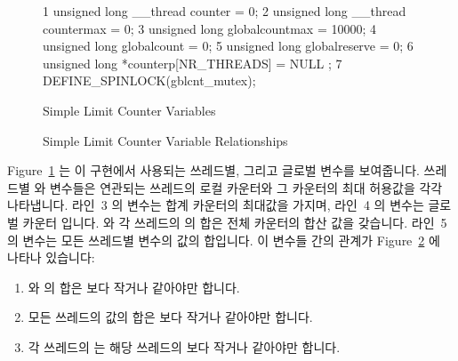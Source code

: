 \begin{figure}[tbp]
{ \scriptsize
\begin{verbbox}
  1 unsigned long __thread counter = 0;
  2 unsigned long __thread countermax = 0;
  3 unsigned long globalcountmax = 10000;
  4 unsigned long globalcount = 0;
  5 unsigned long globalreserve = 0;
  6 unsigned long *counterp[NR_THREADS] = { NULL };
  7 DEFINE_SPINLOCK(gblcnt_mutex);
\end{verbbox}
}
\centering
\theverbbox
\caption{Simple Limit Counter Variables}
\label{fig:count:Simple Limit Counter Variables}
\end{figure}

\begin{figure}[tb]
\centering
{}
\caption{Simple Limit Counter Variable Relationships}
\label{fig:count:Simple Limit Counter Variable Relationships}
\end{figure}

Figure~\ref{fig:count:Simple Limit Counter Variables} 는 이 구현에서 사용되는
쓰레드별, 그리고 글로벌 변수를 보여줍니다.
쓰레드별  와  변수들은 연관되는 쓰레드의 로컬
카운터와 그 카운터의 최대 허용값을 각각 나타냅니다.
라인~3 의  변수는 합계 카운터의 최대값을 가지며, 라인~4 의
 변수는 글로벌 카운터 입니다.
 와 각 쓰레드의  의 합은 전체 카운터의 합산 값을
갖습니다.
라인~5 의  변수는 모든 쓰레드별  변수의 값의
합입니다.
이 변수들 간의 관계가
Figure~\ref{fig:count:Simple Limit Counter Variable Relationships} 에 나타나
있습니다:
\begin{enumerate}
\item	{} 와  의 합은  보다
	작거나 같아야만 합니다.
\item	모든 쓰레드의  값의 합은  보다 작거나
	같아야만 합니다.
\item	각 쓰레드의  는 해당 쓰레드의  보다 작거나
	같아야만 합니다.
\end{enumerate}
\iffalse

